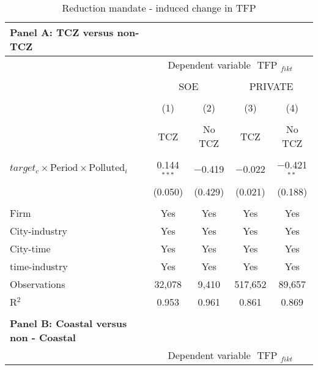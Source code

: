 \documentclass[12pt]{article}
\begin{document}
\begin{table}[!htb] \centering
    \caption{\\ Reduction mandate - induced change in TFP}
      \begin{adjustbox}{width=\textwidth, totalheight=\baselineskip,keepaspectratio}
     \label{table_10}
      \begin{tabular}{@{\extracolsep{5pt}}lcccc}  
        \multicolumn{1}{l}{\textbf{Panel A: TCZ versus non-TCZ}} \\
        \toprule
        & \multicolumn{4}{c}{Dependent variable $\text { TFP }_{fikt}$} \\ 
\cline{2-5}
            
\\[-1.8ex]
            &\multicolumn{2}{c}{SOE}&\multicolumn{2}{c}{PRIVATE}\\
\\[-1.8ex] & (1) & (2) & (3) & (4)\\
 \\[-1.8ex]& TCZ & No TCZ & TCZ & No TCZ\\
 \hline \\[-1.8ex] 
   $target_c \times \text{Period} \times \text{Polluted}_i$  & 0.144$^{***}$ & $-$0.419 & $-$0.022 & $-$0.421$^{**}$ \\ 
  & (0.050) & (0.429) & (0.021) & (0.188) \\ 
 \hline \\[-1.8ex] 
Firm & Yes & Yes & Yes & Yes \\ 
City-industry &Yes & Yes & Yes & Yes \\ 
City-time & Yes & Yes & Yes & Yes \\ 
time-industry & Yes & Yes & Yes & Yes \\ 
Observations & 32,078 & 9,410 & 517,652 & 89,657 \\ 
R$^{2}$ & 0.953 & 0.961 & 0.861 & 0.869 \\

        \bottomrule
        \\ %
        \multicolumn{1}{l}{\textbf{Panel B: Coastal  versus non - Coastal}} \\
        \toprule
        & \multicolumn{4}{c}{Dependent variable $\text { TFP }_{fikt}$} \\ 
\cline{2-5}
            

\end{tabular}
\end{adjustbox}
\end{table}
\end{document}
